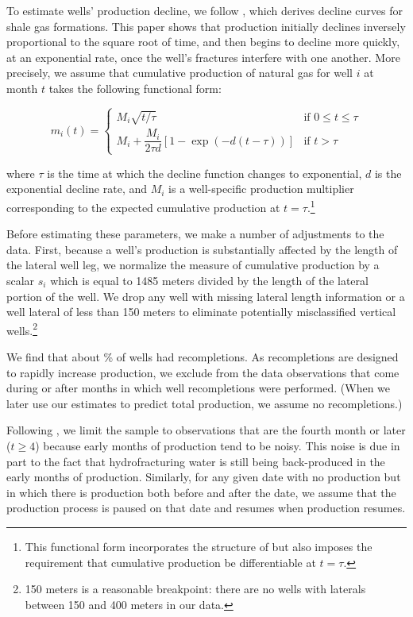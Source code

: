 \documentclass[12pt]{article}
\begin{document}
To estimate wells' production decline, we follow \citet{bib:patzek}, which derives decline curves for shale gas formations. This paper shows that production initially declines inversely proportional to the square root of time, and then begins to decline more quickly, at an exponential rate, once the well's fractures interfere with one another. More precisely, we assume that cumulative production of natural gas for well $i$ at month $t$ takes the following functional form:

\begin{equation}
m_i(t) =
\begin{cases}
M_i \sqrt{t / \tau } & \mbox{if } 0 \leq t \leq \tau \\
M_i +  \dfrac{ M_i }{2 \tau d} \left[ 1 - \exp(-d (t - \tau)) \right] & \mbox{if } t > \tau
\end{cases}
\end{equation}

where $\tau$ is the time at which the decline function changes to exponential, $d$ is the exponential decline rate, and $M_i$ is a well-specific production multiplier corresponding to the expected cumulative production at $t = \tau$.\footnote{This functional form incorporates the structure of \citet{bib:patzek} but also imposes the requirement that cumulative production be differentiable at $t=\tau$.}

Before estimating these parameters, we make a number of adjustments to the data. First, because a well's production is substantially affected by the length of the lateral well leg, we normalize the measure of cumulative production by a scalar $s_i$ which is equal to 1485 meters divided by the length of the lateral portion of the well. We drop any well with missing lateral length information or a well lateral of less than 150 meters to eliminate potentially misclassified vertical wells.\footnote{150 meters is a reasonable breakpoint: there are no wells with laterals between 150 and 400 meters in our data.}

We find that about \unskip \% of wells had recompletions. As recompletions are designed to rapidly increase production, we exclude from the data observations that come during or after months in which well recompletions were performed. (When we later use our estimates to predict total production, we assume no recompletions.)

Following \citet{bib:patzek}, we limit the sample to observations that are the fourth month or later ($t \geq 4$) because early months of production tend to be noisy. This noise is due in part to the fact that hydrofracturing water is still being back-produced in the early months of production. Similarly, for any given date with no production but in which there is production both before and after the date, we assume that the production process is paused on that date and resumes when production resumes.
\end{document}
